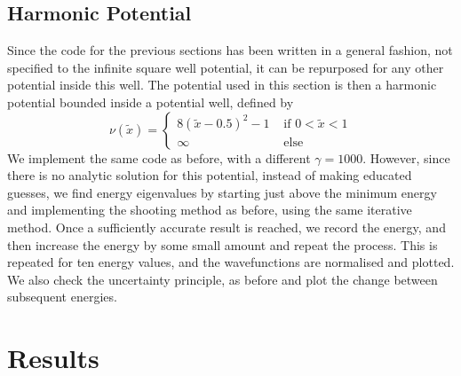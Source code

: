 \documentclass[10pt,a4paper]{article}
\theoremstyle{definition}
\theoremstyle{remark}
\begin{document}
\subsection{Harmonic Potential}
Since the code for the previous sections has been written in a general fashion, not specified to the infinite square well potential, it can be repurposed for any other potential inside this well. The potential used in this section is then a harmonic potential bounded inside a potential well, defined by
\begin{equation}
    \label{eq: harmonic_potential}
    \nu(\tilde{x}) = \begin{cases}
        8(\tilde{x}-0.5)^2 - 1 & \text{ if } 0<\tilde{x}<1\\
        \infty & \text{ else}
    \end{cases}
\end{equation}
We implement the same code as before, with a different $\gamma = 1000$. However, since there is no analytic solution for this potential, instead of making educated guesses, we find energy eigenvalues by starting just above the minimum energy and implementing the shooting method as before, using the same iterative method. Once a sufficiently accurate result is reached, we record the energy, and then increase the energy by some small amount and repeat the process. This is repeated for ten energy values, and the wavefunctions are normalised and plotted. We also check the uncertainty principle, as before and plot the change between subsequent energies.
\section{Results}
\end{document}
